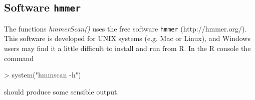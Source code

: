 \documentclass{article}
\begin{document}
\subsection{Software \texttt{hmmer}}
The functions \emph{hmmerScan()} uses the free software \texttt{hmmer} (http://hmmer.org/). This software is developed for UNIX systems (e.g. Mac or Linux), and Windows users may find it a little difficult to install and run from R. In the R console the command
\begin{Schunk}
\begin{Sinput}
> system("hmmscan -h")
\end{Sinput}
\end{Schunk}
should produce some sensible output.
\end{document}
